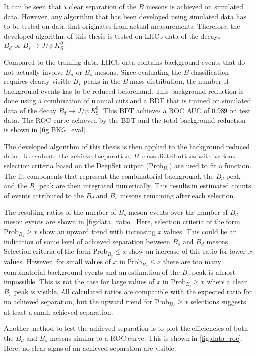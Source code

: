 It can be seen that a clear separation of the $B$ mesons is achieved on simulated data.
However, any algorithm that has been developed using simulated data has to be tested on data that originates from actual measurements. 
Therefore, the developed algorithm of this thesis is tested on LHCb data of the decays $B_d \text{ or } B_s \rightarrow J/\psi \, K^0_\text{S}$.

Compared to the training data, LHCb data contains background events that do not actually involve $B_d$ or $B_s$ mesons.
Since evaluating the $B$ classification requires clearly visible $B_s$ peaks in the $B$ mass distribution, the number of background events has to be reduced beforehand.
This background reduction is done using a combination of manual cuts and a BDT that is trained on simulated data of the decay $B_d \rightarrow J/\psi \, K^0_\text{S}$.
This BDT achieves a ROC AUC of $0.989$ on test data.
The ROC curve achieved by the BDT and the total background reduction is shown in \cref{fig:BKG_eval}.

The developed algorithm of this thesis is then applied to the background reduced data.
To evaluate the achieved separation, $B$ mass distributions with various selection criteria based on the DeepSet output ($\text{Prob}_{B_s}$) are used to fit a function.
The fit components that represent the combinatorial background, the $B_d$ peak and the $B_s$ peak are then integrated numerically.
This results in estimated counts of events attributed to the $B_d$ and $B_s$ mesons remaining after each selection.

The resulting ratios of the number of $B_s$ meson events over the number of $B_d$ meson events are shown in \cref{fig:data_ratio}.
Here, selection criteria of the form $\text{Prob}_{B_s} \geq x$ show an upward trend with increasing $x$ values.
This could be an indication of some level of achieved separation between $B_s$ and $B_d$ mesons.
Selection criteria of the form $\text{Prob}_{B_s} \leq x$ show an increase of this ratio for lower $x$ values.
However, for small values of $x$ in $\text{Prob}_{B_s} \leq x$ there are too many combinatorial background events and an estimation of the $B_s$ peak is almost impossible. 
This is not the case for large values of $x$ in $\text{Prob}_{B_s} \geq x$ where a clear $B_s$ peak is visible.
All calculated ratios are compatible with the expected ratio for no achieved separation, but the upward trend for $\text{Prob}_{B_s} \geq x$ selections suggests at least a small achieved separation.

Another method to test the achieved separation is to plot the efficiencies of both the $B_d$ and $B_s$ mesons similar to a ROC curve.
This is shown in \cref{fig:data_roc}.
Here, no clear signs of an achieved separation are visible.

